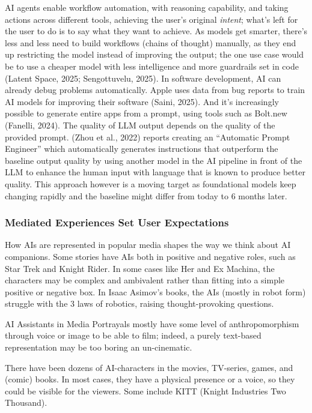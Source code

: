 \documentclass[
  letterpaper,
  DIV=11,
  numbers=noendperiod]{scrartcl}
\begin{document}
AI agents enable workflow automation, with reasoning capability, and
taking actions across different tools, achieving the user's original
\emph{intent}; what's left for the user to do is to say what they want
to achieve. As models get smarter, there's less and less need to build
workflows (chains of thought) manually, as they end up restricting the
model instead of improving the output; the one use case would be to use
a cheaper model with less intelligence and more guardrails set in code
(Latent Space, 2025; Sengottuvelu, 2025). In software development, AI
can already debug problems automatically. Apple uses data from bug
reports to train AI models for improving their software (Saini, 2025).
And it's increasingly possible to generate entire apps from a prompt,
using tools such as Bolt.new (Fanelli, 2024). The quality of LLM output
depends on the quality of the provided prompt. (Zhou et al., 2022)
reports creating an ``Automatic Prompt Engineer'' which automatically
generates instructions that outperform the baseline output quality by
using another model in the AI pipeline in front of the LLM to enhance
the human input with language that is known to produce better quality.
This approach however is a moving target as foundational models keep
changing rapidly and the baseline might differ from today to 6 months
later.

\subsubsection{Mediated Experiences Set User
Expectations}\label{mediated-experiences-set-user-expectations}

How AIs are represented in popular media shapes the way we think about
AI companions. Some stories have AIs both in positive and negative
roles, such as Star Trek and Knight Rider. In some cases like Her and Ex
Machina, the characters may be complex and ambivalent rather than
fitting into a simple positive or negative box. In Isaac Asimov's books,
the AIs (mostly in robot form) struggle with the 3 laws of robotics,
raising thought-provoking questions.

AI Assistants in Media Portrayals mostly have some level of
anthropomorphism through voice or image to be able to film; indeed, a
purely text-based representation may be too boring an un-cinematic.

There have been dozens of AI-characters in the movies, TV-series, games,
and (comic) books. In most cases, they have a physical presence or a
voice, so they could be visible for the viewers. Some include KITT
(Knight Industries Two Thousand).
\end{document}
